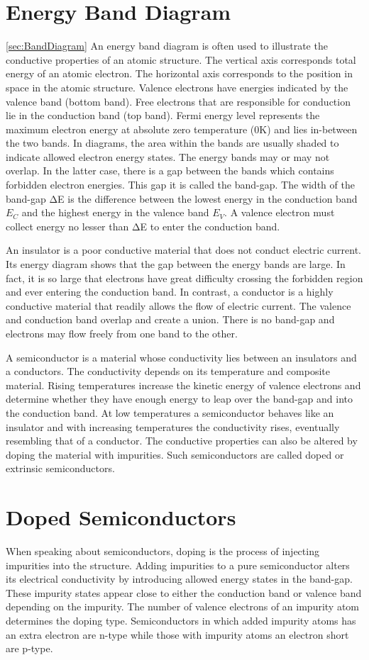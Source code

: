 \section{Energy Band Diagram}
\ref{sec:BandDiagram}
An energy band diagram is often used to illustrate the conductive properties of an atomic structure. The vertical axis corresponds total energy of an atomic electron. The horizontal axis corresponds to the position in space in the atomic structure. Valence electrons have energies indicated by the valence band (bottom band). Free electrons that are responsible for conduction lie in the conduction band (top band). Fermi energy level represents the maximum electron energy at absolute zero temperature (0K) and lies in-between the two bands. In diagrams, the area within the bands are usually shaded to indicate allowed electron energy states. The energy bands may or may not overlap. In the latter case, there is a gap between the bands which contains forbidden electron energies. This gap it is called the band-gap. The width of the band-gap ΔE is the difference between the lowest energy in the conduction band $E_C$ and the highest energy in the valence band $E_V$. A valence electron must collect energy no lesser than ΔE to enter the conduction band.  

An insulator is a poor conductive material that does not conduct electric current. Its energy diagram shows that the gap between the energy bands are large. In fact, it is so large that electrons have great difficulty crossing the forbidden region and ever entering the conduction band.
In contrast, a conductor is a highly conductive material that readily allows the flow of electric current. The valence and conduction band overlap and create a union. There is no band-gap and electrons may flow freely from one band to the other.

A semiconductor is a material whose conductivity lies between an insulators and a conductors. The conductivity depends on its temperature and composite material. Rising temperatures increase the kinetic energy of valence electrons and determine whether they have enough energy to leap over the band-gap and into the conduction band. At low temperatures a semiconductor behaves like an insulator and with increasing temperatures the conductivity rises, eventually resembling that of a conductor. The conductive properties can also be altered by doping the material with impurities. Such semiconductors are called doped or extrinsic semiconductors.


\section{Doped Semiconductors}
When speaking about semiconductors, doping is the process of injecting impurities into the structure. Adding impurities to a pure semiconductor alters its electrical conductivity by introducing allowed energy states in the band-gap. These impurity states appear close to either the conduction band or valence band depending on the impurity. The number of valence electrons of an impurity atom determines the doping type. Semiconductors in which added impurity atoms has an extra electron are n-type while those with impurity atoms an electron short are p-type.

